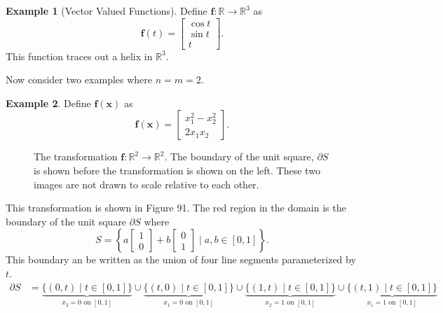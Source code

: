 \documentclass{article}
\newcommand{\R}{\mathbb{R}}
\newcommand{\x}{\mathbf{x}}
\newcommand{\f}{\mathbf{f}}
\theoremstyle{definition}
\newtheorem{example}{Example}[section]
\begin{document}
\begin{example}[Vector Valued Functions]
	Define $ \f:\R\to\R^3 $ as $$ \f(t)=\begin{bmatrix}
		\cos t\\ \sin t\\ t
	\end{bmatrix}  .$$  This function traces out a helix in $ \R^3 $. 
\end{example}

Now consider two examples where $ n=m=2 $. 
\begin{example}
	Define $ \f(\x) $ as $$ \f(\x)=\begin{bmatrix}
		x_1^2-x_2^2\\
		2x_1x_2
	\end{bmatrix}. $$
	\begin{figure}[h!]
		\centering
	\caption{The transformation $ \f:\R^2\to\R^2 $. The boundary of the unit square, $ \partial S $ is shown before the transformation is shown on the left. These two images are not drawn to scale relative to each other. }
	\end{figure}	
This transformation is shown in Figure 91. The red region in the domain is the boundary of the unit square $ \partial S $ where $$ S=\left\{a\begin{bmatrix}
	1\\0
\end{bmatrix} + b\begin{bmatrix}
	0\\1
\end{bmatrix}\mid a,b\in[0,1]\right\}.$$
This boundary an be written as the union of four line segments parameterized by $ t $. 
\begin{align*}
	\partial S & = \underbrace{\{(0,t) \mid t \in [0,1]\}}_{x_2=0\text{ on }[0,1]} \cup\underbrace{ \{(t,0) \mid t \in [0,1]\} }_{x_1=0\text{ on }[0,1]}\cup\underbrace{ \{(1,t) \mid t \in [0,1]\} }_{x_2=1\text{ on }[0,1]} \cup\underbrace{ \{(t,1) \mid t \in [0,1]\} }_{x_1=1\text{ on }[0,1]}

\end{align*}
\end{example}
\end{document}
